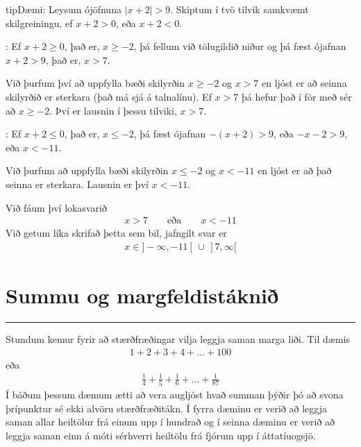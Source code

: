 \documentclass[a4paper,10pt,icelandic]{sphinxmanual}
\begin{document}
\begin{sphinxadmonition}{tip}{Dæmi:}
Leysum ójöfnuna \(|x+2|>9\). Skiptum í tvö tilvik samkvæmt skilgreiningu, ef \(x+2>0\), eða \(x+2<0\).

:
Ef \(x+2 \geq 0\), það er, \(x \geq -2\), þá fellum við tölugildið niður og þá fæst ójafnan \(x+2>9\), það er, \(x>7\).

Við þurfum því að uppfylla bæði skilyrðin \(x \geq -2\) og \(x>7\) en ljóst er að seinna skilyrðið er sterkara (það má sjá á talnalínu). Ef \(x >7\) þá hefur það í för með sér að \(x \geq -2\). Því er lausnin í þessu tilviki, \(x >7\).

:
Ef \(x+2 \leq 0\), það er, \(x \leq -2\), þá fæst ójafnan \(-(x+2)>9\), eða \(-x-2>9\), eða \(x<-11\).

Við þurfum að uppfylla bæði skilyrðin \(x \leq -2\) og \(x<-11\) en ljóst er að það seinna er sterkara. Lausnin er því \(x<-11\).

Við fáum því lokasvarið
\begin{equation*}
\begin{split}x >7 \qquad \text{eða} \qquad x<-11\end{split}
\end{equation*}
Við getum líka skrifað þetta sem bil, jafngilt svar er
\begin{equation*}
\begin{split}x \in ]- \infty , -11[ \, \cup \, ]7, \infty[\end{split}
\end{equation*}\end{sphinxadmonition}


\section{Summu\sphinxhyphen{} og margfeldistáknið}
\label{\detokenize{Kafli02:summu-og-margfeldistakni}}

\bigskip\hrule\bigskip


Stundum kemur fyrir að stærðfræðingar vilja leggja saman marga liði. Til dæmis
\begin{equation*}
\begin{split}1+2+3+4+...+100\end{split}
\end{equation*}
eða
\begin{equation*}
\begin{split}\frac{1}{4}+\frac{1}{5}+\frac{1}{6}+...+\frac{1}{87}\end{split}
\end{equation*}
Í báðum þessum dæmum ætti að vera augljóst hvað summan þýðir þó að svona þrípunktur sé ekki alvöru stærðfræðitákn.
Í fyrra dæminu er verið að leggja saman allar heiltölur frá einum upp í hundrað og í seinna dæminu er verið að leggja saman einn á móti sérhverri heiltölu frá fjórum upp í áttatíu\sphinxhyphen{}og\sphinxhyphen{}sjö.
\end{document}
